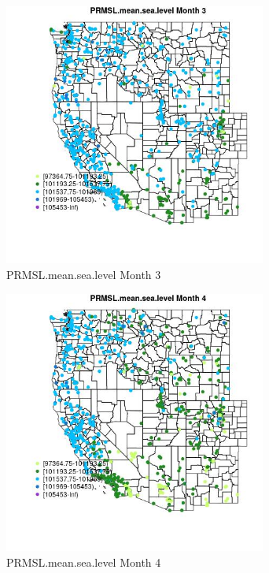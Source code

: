 \begin{figure} 
\centering  
\includegraphics[width=0.77\textwidth]{Code_Outputs/Report_ML_input_PM25_Step4_part_f_de_duplicated_aveswNAs_MapObsMo3PRMSLmeansealevel.jpg} 
\caption{\label{fig:Report_ML_input_PM25_Step4_part_f_de_duplicated_aveswNAsMapObsMo3PRMSLmeansealevel}PRMSL.mean.sea.level Month 3} 
\end{figure} 
 

\begin{figure} 
\centering  
\includegraphics[width=0.77\textwidth]{Code_Outputs/Report_ML_input_PM25_Step4_part_f_de_duplicated_aveswNAs_MapObsMo4PRMSLmeansealevel.jpg} 
\caption{\label{fig:Report_ML_input_PM25_Step4_part_f_de_duplicated_aveswNAsMapObsMo4PRMSLmeansealevel}PRMSL.mean.sea.level Month 4} 
\end{figure} 
 

